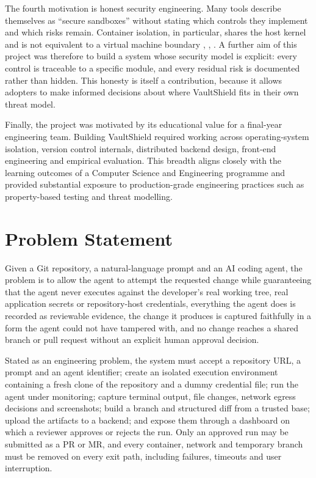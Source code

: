 \documentclass[12pt,a4paper,oneside]{report}
\begin{document}
The fourth motivation is honest security engineering. Many tools describe themselves as ``secure sandboxes'' without stating which controls they implement and which risks remain. Container isolation, in particular, shares the host kernel and is not equivalent to a virtual machine boundary \cite{ref11}, \cite{ref12}, \cite{ref13}. A further aim of this project was therefore to build a system whose security model is explicit: every control is traceable to a specific module, and every residual risk is documented rather than hidden. This honesty is itself a contribution, because it allows adopters to make informed decisions about where VaultShield fits in their own threat model.

Finally, the project was motivated by its educational value for a final-year engineering team. Building VaultShield required working across operating-system isolation, version control internals, distributed backend design, front-end engineering and empirical evaluation. This breadth aligns closely with the learning outcomes of a Computer Science and Engineering programme and provided substantial exposure to production-grade engineering practices such as property-based testing and threat modelling.

\section{Problem Statement}\label{problem-statement}

Given a Git repository, a natural-language prompt and an AI coding agent, the problem is to allow the agent to attempt the requested change while guaranteeing that the agent never executes against the developer's real working tree, real application secrets or repository-host credentials, everything the agent does is recorded as reviewable evidence, the change it produces is captured faithfully in a form the agent could not have tampered with, and no change reaches a shared branch or pull request without an explicit human approval decision.

Stated as an engineering problem, the system must accept a repository URL, a prompt and an agent identifier; create an isolated execution environment containing a fresh clone of the repository and a dummy credential file; run the agent under monitoring; capture terminal output, file changes, network egress decisions and screenshots; build a branch and structured diff from a trusted base; upload the artifacts to a backend; and expose them through a dashboard on which a reviewer approves or rejects the run. Only an approved run may be submitted as a PR or MR, and every container, network and temporary branch must be removed on every exit path, including failures, timeouts and user interruption.
\end{document}
